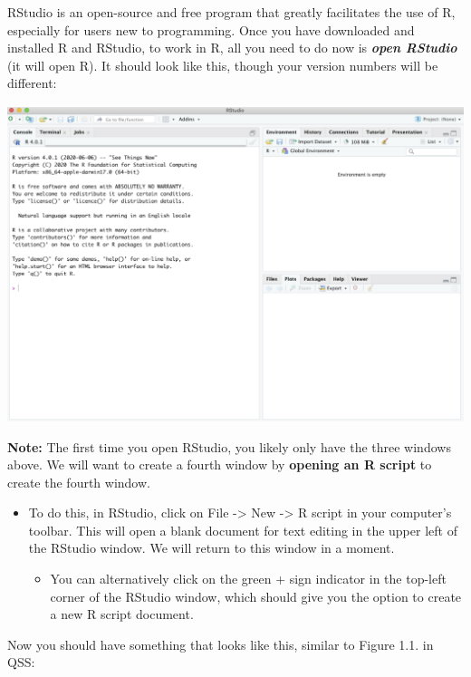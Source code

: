 \documentclass[
  letterpaper,
  DIV=11,
  numbers=noendperiod]{scrreprt}
\providecommand{\tightlist}{%
  \setlength{\itemsep}{0pt}\setlength{\parskip}{0pt}}\usepackage{longtable,booktabs,array}
\begin{document}
RStudio is an open-source and free program that greatly facilitates the
use of R, especially for users new to programming. Once you have
downloaded and installed R and RStudio, to work in R, all you need to do
now is \textbf{\emph{open RStudio}} (it will open R). It should look
like this, though your version numbers will be different:

\includegraphics{images/rconsole1.png}

\textbf{Note:} The first time you open RStudio, you likely only have the
three windows above. We will want to create a fourth window by
\textbf{opening an R script} to create the fourth window.

\begin{itemize}
\tightlist
\item
  To do this, in RStudio, click on File -\textgreater{} New
  -\textgreater{} R script in your computer's toolbar. This will open a
  blank document for text editing in the upper left of the RStudio
  window. We will return to this window in a moment.

  \begin{itemize}
  \tightlist
  \item
    You can alternatively click on the green + sign indicator in the
    top-left corner of the RStudio window, which should give you the
    option to create a new R script document.
  \end{itemize}
\end{itemize}

Now you should have something that looks like this, similar to Figure
1.1. in QSS:
\end{document}
